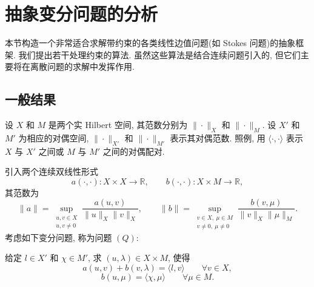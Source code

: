 
\setcounter{section}{3}
\section{抽象变分问题的分析}\label{sec:abstract-variational-problem}

本节构造一个非常适合求解带约束的各类线性边值问题(如 Stokes 问题)的抽象框架.
我们提出若干处理约束的算法. 虽然这些算法是结合连续问题引入的,
但它们主要将在离散问题的求解中发挥作用.

\setcounter{subsection}{0}
\subsection{一般结果}\label{subsec:abstract-general-result}
\setcounter{equation}{0}
\setcounter{statement}{0}

设 $X$ 和 $M$ 是两个实 Hilbert 空间, 其范数分别为
$\|\cdot\|_X$ 和 $\|\cdot\|_M$. 设 $X'$ 和 $M'$ 为相应的对偶空间,
$\|\cdot\|_{X'}$ 和 $\|\cdot\|_{M'}$ 表示其对偶范数.
照例, 用 $\langle\cdot,\cdot\rangle$ 表示 $X$ 与 $X'$ 之间或
$M$ 与 $M'$ 之间的对偶配对.

引入两个连续双线性形式
\[
a(\cdot,\cdot):X\times X\longrightarrow\mathbb R,
\qquad
b(\cdot,\cdot):X\times M\longrightarrow\mathbb R,
\]
其范数为
\[
\|a\|=\sup_{\substack{u,v\in X\\u,v\ne0}}
\frac{a(u,v)}{\|u\|_X\|v\|_X},
\qquad
\|b\|=\sup_{\substack{v\in X,\ \mu\in M\\v\ne0,\ \mu\ne0}}
\frac{b(v,\mu)}{\|v\|_X\|\mu\|_M}.
\]
考虑如下变分问题, 称为问题 $(Q)$:

给定 $l\in X'$ 和 $\chi\in M'$, 求 $(u,\lambda)\in X\times M$, 使得
\begin{equation}\label{eq:abstract-q-first}
a(u,v)+b(v,\lambda)=\langle l,v\rangle
\qquad\forall v\in X,
\end{equation}
\begin{equation}\label{eq:abstract-q-second}
b(u,\mu)=\langle\chi,\mu\rangle
\qquad\forall\mu\in M.
\end{equation}

